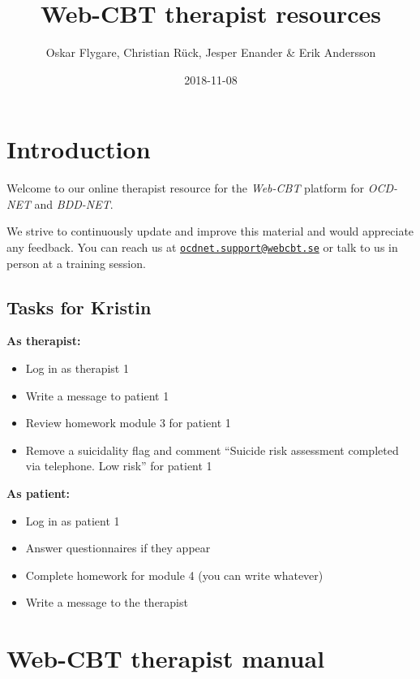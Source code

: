 \documentclass[]{book}
\title{Web-CBT therapist resources}
\author{Oskar Flygare, Christian Rück, Jesper Enander \& Erik Andersson}
\date{2018-11-08}
\providecommand{\tightlist}{%
  \setlength{\itemsep}{0pt}\setlength{\parskip}{0pt}}
\theoremstyle{definition}
\theoremstyle{definition}
\theoremstyle{definition}
\theoremstyle{remark}
\begin{document}
\maketitle

{
\setcounter{tocdepth}{1}
\tableofcontents
}
\hypertarget{introduction}{%
\chapter{Introduction}\label{introduction}}

Welcome to our online therapist resource for the \emph{Web-CBT} platform
for \emph{OCD-NET} and \emph{BDD-NET}.

We strive to continuously update and improve this material and would
appreciate any feedback. You can reach us at
\href{mailto:ocdnet.support@webcbt.se}{\nolinkurl{ocdnet.support@webcbt.se}}
or talk to us in person at a training session.

\hypertarget{tasks-for-kristin}{%
\section{Tasks for Kristin}\label{tasks-for-kristin}}

\textbf{As therapist:}

\begin{itemize}
\tightlist
\item
  Log in as therapist 1
\item
  Write a message to patient 1
\item
  Review homework module 3 for patient 1
\item
  Remove a suicidality flag and comment ``Suicide risk assessment
  completed via telephone. Low risk'' for patient 1
\end{itemize}

\textbf{As patient:}

\begin{itemize}
\tightlist
\item
  Log in as patient 1
\item
  Answer questionnaires if they appear
\item
  Complete homework for module 4 (you can write whatever)
\item
  Write a message to the therapist
\end{itemize}

\hypertarget{webcbt-therapist}{%
\chapter{Web-CBT therapist manual}\label{webcbt-therapist}}
\end{document}
